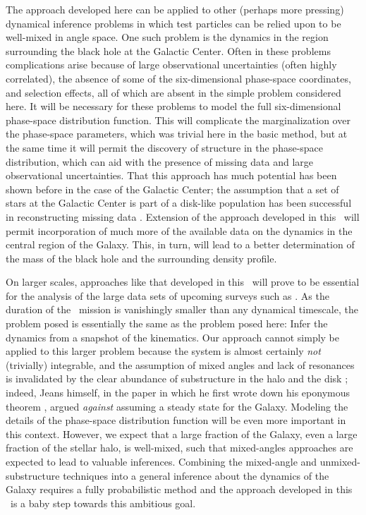 The approach developed here can be applied to other (perhaps more
pressing) dynamical inference problems in which test particles can be
relied upon to be well-mixed in angle space. One such problem is the
dynamics in the region surrounding the black hole at the Galactic
Center. Often in these problems complications arise because of large
observational uncertainties (often highly correlated), the absence of
some of the six-dimensional phase-space coordinates, and selection
effects, all of which are absent in the simple problem considered
here.  It will be necessary for these problems to model the full
six-dimensional phase-space distribution function.  This will
complicate the marginalization over the phase-space parameters, which
was trivial here in the basic method, but at the same time it will
permit the discovery of structure in the phase-space distribution,
which can aid with the presence of missing data and large
observational uncertainties.  That this approach has much potential
has been shown before in the case of the Galactic Center; the
assumption that a set of stars at the Galactic Center is part of a
disk-like population has been successful in reconstructing missing
data \citep{Beloborodov06a}. Extension of the approach developed in
this \chaptername\ will permit incorporation of much more of the
available data on the dynamics in the central region of the Galaxy.
This, in turn, will lead to a better determination of the mass of the
black hole and the surrounding density profile.

On larger scales, approaches like that developed in this \chaptername\
will prove to be essential for the analysis of the large data sets of
upcoming surveys such as \Gaia. As the duration of the \Gaia\ mission
is vanishingly smaller than any dynamical timescale, the problem posed
is essentially the same as the problem posed here: Infer the dynamics
from a snapshot of the kinematics.  Our approach cannot simply be
applied to this larger problem because the system is almost certainly
\emph{not} (trivially) integrable, and the assumption of mixed angles
and lack of resonances is invalidated by the clear abundance of
substructure in the halo \citep[\eg,
][]{willman,belokurovfield,belokurov,koposov} and the disk
\citep{1998AJ....115.2384D,Bovyveldist}; indeed, Jeans himself, in the paper in
which he first wrote down his eponymous theorem \citep{Jeans15a},
argued \emph{against} assuming a steady state for the Galaxy.
Modeling the details of the phase-space distribution function will be
even more important in this context.  However, we expect that a large
fraction of the Galaxy, even a large fraction of the stellar halo, is
well-mixed, such that mixed-angles approaches are expected to lead to
valuable inferences. Combining the mixed-angle and
unmixed-substructure techniques into a general inference about the
dynamics of the Galaxy requires a fully probabilistic method and the
approach developed in this \chaptername\ is a baby step towards this
ambitious goal.


